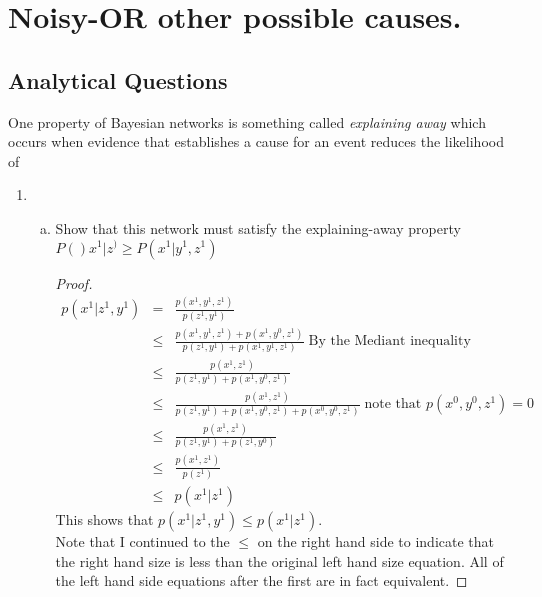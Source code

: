 \documentclass[12pt]{article}
\begin{document}
\section{Noisy-OR  other possible causes.}
	\subsection{Analytical Questions}
	One property of Bayesian networks is something called \textit{explaining away }which occurs when
evidence that establishes a cause for an event reduces the likelihood of
		\begin{enumerate}
			\item	
				\begin{enumerate}[(a)]
					\item Show that this network must satisfy the explaining-away property $P()x^1|z^) \geq P(x^1|y^1,z^1)$
					\begin{proof}
					\begin{eqnarray*}
						p(x^1|z^1,y^1) &=& \frac{p(x^1,y^1,z^1)}{p(z^1,y^1)} \\
												&\leq & \frac{p(x^1,y^1,z^1) + p(x^1,y^0,z^1)}{p(z^1,y^1) + p(x^1,y^1,z^1)}\; \text{By the Mediant inequality} \\
												&\leq & \frac{p(x^1,z^1)}{p(z^1,y^1) + p(x^1,y^0,z^1)} \\
												&\leq & \frac{p(x^1,z^1)}{p(z^1,y^1) + p(x^1,y^0,z^1) + p(x^0,y^0,z^1)}\; \text{note that } p(x^0,y^0,z^1) = 0 \\
												&\leq & \frac{p(x^1,z^1)}{p(z^1,y^1) + p(z^1,y^0)} \\
												&\leq & \frac{p(x^1,z^1)}{p(z^1)} \\
												&\leq & p(x^1|z^1)
					\end{eqnarray*}
					This shows that $p(x^1|z^1,y^1) \leq p(x^1|z^1)$. \\
					Note that I continued to the $\leq$ on the right hand side to indicate that the right hand size is less than the original left hand size equation. All of the left hand side equations after the first are in fact equivalent. 
					\end{proof}
				\end{enumerate}
		\end{enumerate}
\end{document}
